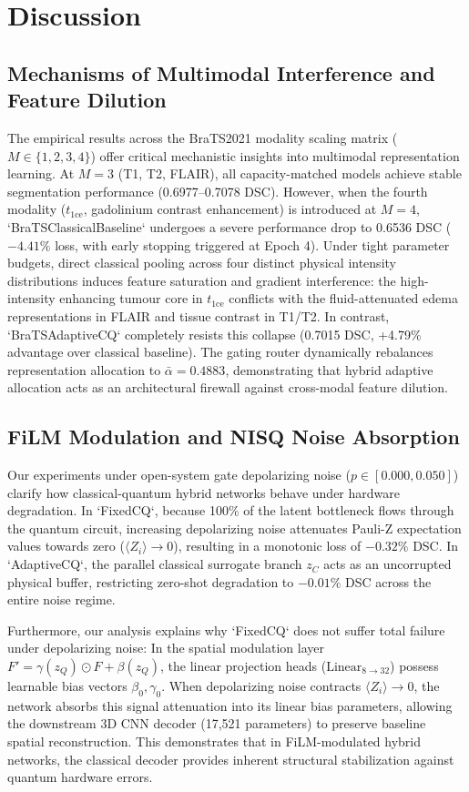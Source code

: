 \section{Discussion}
\label{sec:discussion}

\subsection{Mechanisms of Multimodal Interference and Feature Dilution}
The empirical results across the BraTS2021 modality scaling matrix ($M \in \{1, 2, 3, 4\}$) offer critical mechanistic insights into multimodal representation learning. 
At $M=3$ (T1, T2, FLAIR), all capacity-matched models achieve stable segmentation performance (0.6977--0.7078 DSC). 
However, when the fourth modality ($t_{1\text{ce}}$, gadolinium contrast enhancement) is introduced at $M=4$, `BraTSClassicalBaseline` undergoes a severe performance drop to 0.6536 DSC ($-4.41\%$ loss, with early stopping triggered at Epoch 4). 
Under tight parameter budgets, direct classical pooling across four distinct physical intensity distributions induces feature saturation and gradient interference: the high-intensity enhancing tumour core in $t_{1\text{ce}}$ conflicts with the fluid-attenuated edema representations in FLAIR and tissue contrast in T1/T2. 
In contrast, `BraTSAdaptiveCQ` completely resists this collapse (0.7015 DSC, +4.79\% advantage over classical baseline). 
The gating router dynamically rebalances representation allocation to $\bar{\alpha} = 0.4883$, demonstrating that hybrid adaptive allocation acts as an architectural firewall against cross-modal feature dilution.

\subsection{FiLM Modulation and NISQ Noise Absorption}
Our experiments under open-system gate depolarizing noise ($p \in [0.000, 0.050]$) clarify how classical-quantum hybrid networks behave under hardware degradation. 
In `FixedCQ`, because 100\% of the latent bottleneck flows through the quantum circuit, increasing depolarizing noise attenuates Pauli-Z expectation values towards zero ($\langle Z_i \rangle \to 0$), resulting in a monotonic loss of $-0.32\%$ DSC. 
In `AdaptiveCQ`, the parallel classical surrogate branch $z_C$ acts as an uncorrupted physical buffer, restricting zero-shot degradation to $-0.01\%$ DSC across the entire noise regime. 

Furthermore, our analysis explains why `FixedCQ` does not suffer total failure under depolarizing noise:
In the spatial modulation layer $F' = \gamma(z_Q) \odot F + \beta(z_Q)$, the linear projection heads ($\text{Linear}_{8 \to 32}$) possess learnable bias vectors $\beta_0, \gamma_0$. 
When depolarizing noise contracts $\langle Z_i \rangle \to 0$, the network absorbs this signal attenuation into its linear bias parameters, allowing the downstream 3D CNN decoder (17,521 parameters) to preserve baseline spatial reconstruction. 
This demonstrates that in FiLM-modulated hybrid networks, the classical decoder provides inherent structural stabilization against quantum hardware errors.


